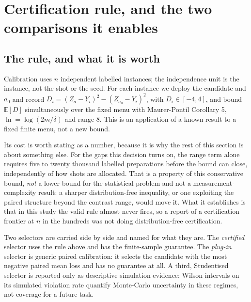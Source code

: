 \documentclass{article}
\begin{document}
\begin{table}[h]\centering\small
\caption{Equation~\eqref{eq:decomp} verified on the 2-qubit control. The residual column is the
difference between the enumerated risk and the closed form; it is machine precision, not a fit.}
\end{table}



\section{Certification rule, and the two comparisons it enables}
\label{sec:certify}

\subsection{The rule, and what it is worth}
Calibration uses $n$ independent labelled instances; the independence unit is the instance, not the
shot or the seed. For each instance we deploy the candidate and $a_0$ and record
$D_i=(Z_a-Y_i)^2-(Z_{a_0}-Y_i)^2$, with $D_i\in[-4,4]$, and bound $\mathbb{E}[D]$ simultaneously over
the fixed menu with Maurer-Pontil Corollary 5, $\ln=\log(2m/\delta)$ and range $8$. This is an
application of a known result to a fixed finite menu, not a new bound.

Its cost is worth stating as a number, because it is why the rest of this section is about something
else. For the gaps this decision turns on, the range term alone requires five to twenty thousand
labelled preparations before the bound can close, independently of how shots are allocated. That is a
property of this conservative bound, \emph{not} a lower bound for the statistical problem and not a
measurement-complexity result: a sharper distribution-free inequality, or one exploiting the paired
structure beyond the contrast range, would move it. What it establishes is that in this study the valid
rule almost never fires, so a report of a certification frontier at $n$ in the hundreds was not doing
distribution-free certification.

Two selectors are carried side by side and named for what they are. The \emph{certified} selector uses
the rule above and has the finite-sample guarantee. The \emph{plug-in} selector is generic paired
calibration: it selects the candidate with the most negative paired mean loss and has no guarantee at
all. A third, Studentised selector is reported only as descriptive simulation evidence; Wilson intervals
on its simulated violation rate quantify Monte-Carlo uncertainty in these regimes, not coverage for a
future task.
\end{document}
